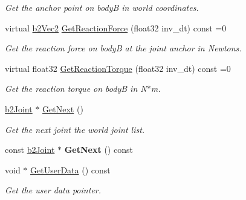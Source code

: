 \begin{DoxyCompactItemize}
\begin{DoxyCompactList}\small\item\em Get the anchor point on bodyB in world coordinates. \end{DoxyCompactList}\item 
\mbox{\label{classb2_joint_a7e0eddefb9b69ad050b8ef6425838a74}} 
virtual \hyperlink{structb2_vec2}{b2\+Vec2} \hyperlink{classb2_joint_a7e0eddefb9b69ad050b8ef6425838a74}{Get\+Reaction\+Force} (float32 inv\+\_\+dt) const =0
\begin{DoxyCompactList}\small\item\em Get the reaction force on bodyB at the joint anchor in Newtons. \end{DoxyCompactList}\item 
\mbox{\label{classb2_joint_ae355e441c2aa842777dc04e24f15ced0}} 
virtual float32 \hyperlink{classb2_joint_ae355e441c2aa842777dc04e24f15ced0}{Get\+Reaction\+Torque} (float32 inv\+\_\+dt) const =0
\begin{DoxyCompactList}\small\item\em Get the reaction torque on bodyB in N$\ast$m. \end{DoxyCompactList}\item 
\mbox{\label{classb2_joint_a1a0e2137b631010750c728cb4e276e5d}} 
\hyperlink{classb2_joint}{b2\+Joint} $\ast$ \hyperlink{classb2_joint_a1a0e2137b631010750c728cb4e276e5d}{Get\+Next} ()
\begin{DoxyCompactList}\small\item\em Get the next joint the world joint list. \end{DoxyCompactList}\item 
\mbox{\label{classb2_joint_aac18301414d6ca0a20aefb471c709e78}} 
const \hyperlink{classb2_joint}{b2\+Joint} $\ast$ {\bfseries Get\+Next} () const
\item 
\mbox{\label{classb2_joint_a798c593c7a4958d408bca10f3b3788f9}} 
void $\ast$ \hyperlink{classb2_joint_a798c593c7a4958d408bca10f3b3788f9}{Get\+User\+Data} () const
\begin{DoxyCompactList}\small\item\em Get the user data pointer. \end{DoxyCompactList}\item 

\end{DoxyCompactItemize}
